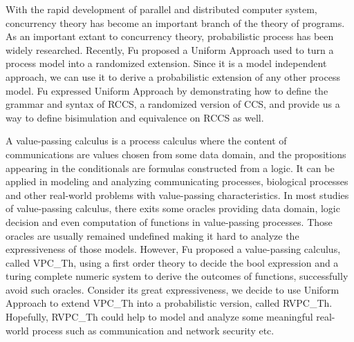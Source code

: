 
\begin{digest}
  With the rapid development of parallel and distributed computer system, 
  concurrency theory has become an important branch of the theory of programs. 
  As an important extant to concurrency theory, 
  probabilistic process has been widely researched. 
  Recently, Fu proposed a Uniform Approach used to turn a process model into a randomized extension. 
  Since it is a model independent approach, 
  we can use it to derive a probabilistic extension of any other process model. 
  Fu expressed Uniform Approach by demonstrating how to define the grammar and syntax of RCCS, 
  a randomized version of CCS, 
  and provide us a way to define bisimulation and equivalence on RCCS as well.

  A value-passing calculus is a process calculus where the content of communications are values chosen from some data domain, 
  and the propositions appearing in the conditionals are formulas constructed from a logic. 
  It can be applied in modeling and analyzing communicating processes, 
  biological processes and other real-world problems with value-passing characteristics. 
  In most studies of value-passing calculus, there exits some oracles providing data domain, 
  logic decision and even computation of functions in value-passing processes. 
  Those oracles are usually remained undefined making it hard to analyze the expressiveness of those models. 
  However, Fu proposed a value-passing calculus, 
  called VPC_Th, using a first order theory to decide the bool expression and a turing complete numeric system to derive the outcomes of functions, 
  successfully avoid such oracles.
Consider its great expressiveness, 
we decide to use Uniform Approach to extend VPC_Th into a probabilistic version, 
called RVPC_Th. Hopefully, RVPC_Th could help to model and analyze some meaningful real-world process such as communication and network security etc.

\end{digest}

